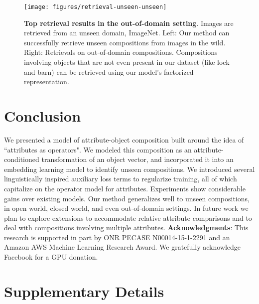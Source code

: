 \documentclass[runningheads]{llncs}
\begin{document}
\begin{figure}[t]
\centering
\texttt{[image: figures/retrieval-unseen-unseen]}
\vspace{-0.2in}
\caption{\textbf{Top retrieval results in the out-of-domain setting}. Images are retrieved from an unseen domain, ImageNet. Left: Our method can successfully retrieve unseen compositions from images in the wild. Right: Retrievals on out-of-domain compositions. Compositions involving objects that are not even present in our dataset (like lock and barn) can be retrieved using our model's factorized representation.}
\label{fig:retrieval-unseen-unseen}
\vspace{-0.2in}
\end{figure} \vspace*{-0.1in}
\section{Conclusion}

We presented a model of attribute-object composition built around the idea of ``attributes as operators". We modeled this composition as an attribute-conditioned transformation of an object vector, and incorporated it into an embedding learning model to identify unseen compositions. We introduced several linguistically inspired auxiliary loss terms to regularize training, all of which capitalize on the operator model for attributes. Experiments show considerable gains over existing models. 
Our method generalizes well to unseen compositions, in open world, closed world, and even out-of-domain settings. In future work we plan to explore extensions to accommodate relative attribute comparisons and to deal with compositions involving multiple attributes. 
\vspace*{0.05in}
{\noindent \textbf{Acknowledgments}: This research is supported in part by ONR PECASE N00014-15-1-2291 and an Amazon AWS Machine Learning Research Award. We gratefully acknowledge Facebook for a GPU donation.}
 




\newpage
\section{Supplementary Details}
\end{document}
